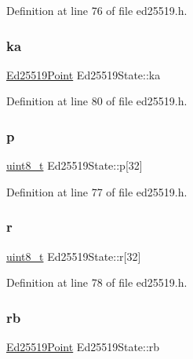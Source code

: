 Definition at line 76 of file ed25519.\+h.

\mbox{\label{structEd25519State_aec75f16ad3e620e0cbceb28e78285332}} 
\subsubsection{\texorpdfstring{ka}{ka}}
{\footnotesize\ttfamily \hyperlink{structEd25519Point}{Ed25519\+Point} Ed25519\+State\+::ka}



Definition at line 80 of file ed25519.\+h.

\mbox{\label{structEd25519State_adb404431ce31a8acc6cdf1a9f60d708d}} 
\subsubsection{\texorpdfstring{p}{p}}
{\footnotesize\ttfamily \hyperlink{stdint_8h_aba7bc1797add20fe3efdf37ced1182c5}{uint8\+\_\+t} Ed25519\+State\+::p\mbox{[}32\mbox{]}}



Definition at line 77 of file ed25519.\+h.

\mbox{\label{structEd25519State_a2dd4b3e1978f23bef13c5b3fbfbd5fb5}} 
\subsubsection{\texorpdfstring{r}{r}}
{\footnotesize\ttfamily \hyperlink{stdint_8h_aba7bc1797add20fe3efdf37ced1182c5}{uint8\+\_\+t} Ed25519\+State\+::r\mbox{[}32\mbox{]}}



Definition at line 78 of file ed25519.\+h.

\mbox{\label{structEd25519State_a7afd80821acafe24712defd6093d9e0a}} 
\subsubsection{\texorpdfstring{rb}{rb}}
{\footnotesize\ttfamily \hyperlink{structEd25519Point}{Ed25519\+Point} Ed25519\+State\+::rb}



